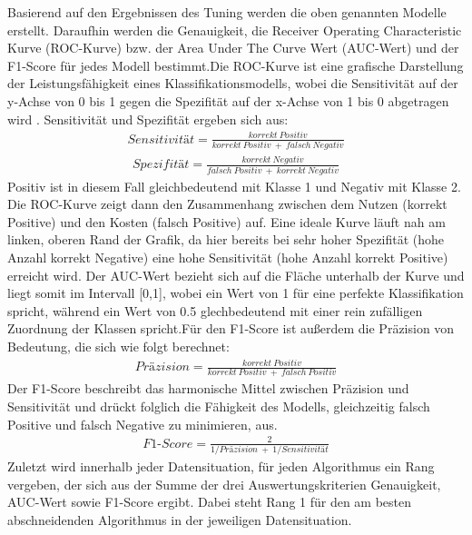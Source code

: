\documentclass[
]{article}
\begin{document}
Basierend auf den Ergebnissen des Tuning werden die oben genannten
Modelle erstellt. Daraufhin werden die Genauigkeit, die Receiver
Operating Characteristic Kurve (ROC-Kurve) bzw. der Area Under The Curve
Wert (AUC-Wert) und der F1-Score für jedes Modell bestimmt.\newline Die
ROC-Kurve ist eine grafische Darstellung der Leistungsfähigkeit eines
Klassifikationsmodells, wobei die Sensitivität auf der y-Achse von 0 bis
1 gegen die Spezifität auf der x-Achse von 1 bis 0 abgetragen wird
\parencite{fawcettIntroductionROCAnalysis2006}. Sensitivität und
Spezifität ergeben sich aus: \begin{align}
Sensitivität=\frac{korrekt~Positiv}{korrekt~Positiv~+~falsch~Negativ}
\end{align} \begin{align}
Spezifität=\frac{korrekt~Negativ}{falsch~Positiv~+~korrekt~Negativ}
\end{align} Positiv ist in diesem Fall gleichbedeutend mit Klasse 1 und
Negativ mit Klasse 2. Die ROC-Kurve zeigt dann den Zusammenhang zwischen
dem Nutzen (korrekt Positive) und den Kosten (falsch Positive) auf. Eine
ideale Kurve läuft nah am linken, oberen Rand der Grafik, da hier
bereits bei sehr hoher Spezifität (hohe Anzahl korrekt Negative) eine
hohe Sensitivität (hohe Anzahl korrekt Positive) erreicht wird. Der
AUC-Wert bezieht sich auf die Fläche unterhalb der Kurve und liegt somit
im Intervall {[}0,1{]}, wobei ein Wert von 1 für eine perfekte
Klassifikation spricht, während ein Wert von 0.5 glechbedeutend mit
einer rein zufälligen Zuordnung der Klassen spricht.\newline Für den
F1-Score ist außerdem die Präzision von Bedeutung, die sich wie folgt
berechnet\parencite{fawcettIntroductionROCAnalysis2006}: \begin{align}
Präzision=\frac{korrekt~Positiv}{korrekt~Positiv~+~falsch~Positiv}
\end{align} Der F1-Score beschreibt das harmonische Mittel zwischen
Präzision und Sensitivität und drückt folglich die Fähigkeit des
Modells, gleichzeitig falsch Positive und falsch Negative zu minimieren,
aus. \begin{align}
F1\text{-}Score=\frac{2}{1/Präzision~+~1/Sensitivität}
\end{align}\newline Zuletzt wird innerhalb jeder Datensituation, für
jeden Algorithmus ein Rang vergeben, der sich aus der Summe der drei
Auswertungskriterien Genauigkeit, AUC-Wert sowie F1-Score ergibt. Dabei
steht Rang 1 für den am besten abschneidenden Algorithmus in der
jeweiligen Datensituation.
\end{document}
